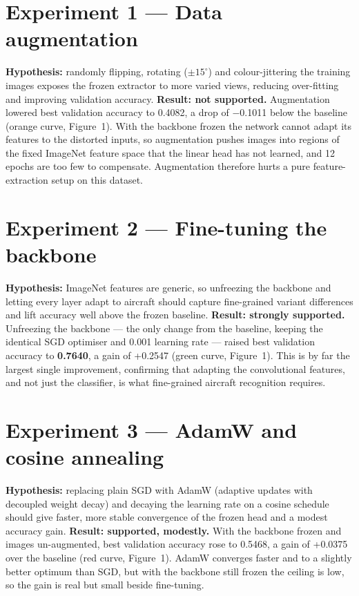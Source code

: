 \documentclass[10pt,a4paper,twocolumn]{article}
\begin{document}
\section{Experiment 1 --- Data augmentation}
\textbf{Hypothesis:} randomly flipping, rotating ($\pm15^\circ$) and colour-jittering the training
images exposes the frozen extractor to more varied views, reducing over-fitting and improving
validation accuracy. \textbf{Result: not supported.} Augmentation lowered best validation accuracy
to 0.4082, a drop of $-$0.1011 below the baseline (orange curve, Figure~1). With the backbone frozen
the network cannot adapt its features to the distorted inputs, so augmentation pushes images into
regions of the fixed ImageNet feature space that the linear head has not learned, and 12
epochs are too few to compensate. Augmentation therefore hurts a pure feature-extraction setup on
this dataset.

\section{Experiment 2 --- Fine-tuning the backbone}
\textbf{Hypothesis:} ImageNet features are generic, so unfreezing the backbone and letting every
layer adapt to aircraft should capture fine-grained variant differences and lift accuracy well
above the frozen baseline. \textbf{Result: strongly supported.} Unfreezing the backbone --- the
only change from the baseline, keeping the identical SGD optimiser and 0.001 learning rate ---
raised best validation accuracy to \textbf{0.7640}, a gain of +0.2547 (green curve, Figure~1). This is
by far the largest single improvement, confirming that adapting the convolutional features, and
not just the classifier, is what fine-grained aircraft recognition requires.

\section{Experiment 3 --- AdamW and cosine annealing}
\textbf{Hypothesis:} replacing plain SGD with AdamW (adaptive updates with decoupled weight decay)
and decaying the learning rate on a cosine schedule should give faster, more stable convergence of
the frozen head and a modest accuracy gain. \textbf{Result: supported, modestly.} With the backbone
frozen and images un-augmented, best validation accuracy rose to 0.5468, a gain of +0.0375 over
the baseline (red curve, Figure~1). AdamW converges faster and to a slightly better optimum than
SGD, but with the backbone still frozen the ceiling is low, so the gain is real but small beside
fine-tuning.
\end{document}
